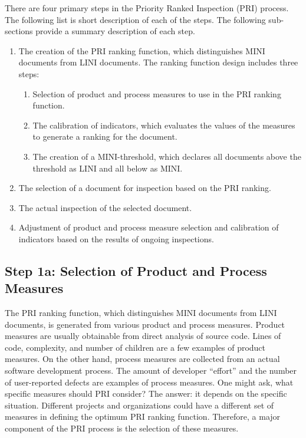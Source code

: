 
There are four primary steps in the Priority Ranked Inspection (PRI)
process. The following list is short description of each of the steps. The
following sub-sections provide a summary description of each step.

\begin{enumerate}
\item The creation of the PRI ranking function, which distinguishes
  MINI documents from LINI documents. The ranking function design
  includes three steps: 
\begin{enumerate}
\item Selection of product and process measures to use in the PRI
  ranking function.
\item The calibration of indicators, which evaluates the values of the
  measures to generate a ranking for the document.
\item The creation of a MINI-threshold, which declares all documents above
  the threshold as LINI and all below as MINI. 
\end{enumerate}
\item The selection of a document for inspection based on the PRI
  ranking.
\item The actual inspection of the selected document.
\item Adjustment of product and process measure selection and calibration
  of indicators based on the results of ongoing inspections.
\end{enumerate}


\subsection{Step 1a: Selection of Product and Process Measures}
The PRI ranking function, which distinguishes MINI documents from LINI
documents, is generated from various product and process measures. Product
measures are usually obtainable from direct analysis of source code. Lines
of code, complexity, and number of children are a few examples of product
measures. On the other hand, process measures are collected from an actual
software development process. The amount of developer ``effort'' and the
number of user-reported defects are examples of process measures. One might
ask, what specific measures should PRI consider? The answer: it depends on
the specific situation. Different projects and organizations could have a
different set of measures in defining the optimum PRI ranking function.
Therefore, a major component of the PRI process is the selection of these
measures.

